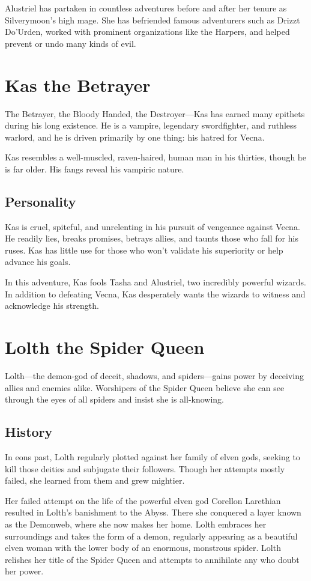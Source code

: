\documentclass[10pt,a4paper,twoside,bg=print,twocolumn,openany,nodeprecatedcode]{dndbook}
\begin{document}
Alustriel has partaken in countless adventures before and after her tenure as Silverymoon's high mage. She has befriended famous adventurers such as Drizzt Do'Urden, worked with prominent organizations like the Harpers, and helped prevent or undo many kinds of evil.

\section{Kas the Betrayer}
The Betrayer, the Bloody Handed, the Destroyer—Kas has earned many epithets during his long existence. He is a vampire, legendary swordfighter, and ruthless warlord, and he is driven primarily by one thing: his hatred for Vecna.

Kas resembles a well-muscled, raven-haired, human man in his thirties, though he is far older. His fangs reveal his vampiric nature.

\subsection{Personality}
Kas is cruel, spiteful, and unrelenting in his pursuit of vengeance against Vecna. He readily lies, breaks promises, betrays allies, and taunts those who fall for his ruses. Kas has little use for those who won't validate his superiority or help advance his goals.

In this adventure, Kas fools Tasha and Alustriel, two incredibly powerful wizards. In addition to defeating Vecna, Kas desperately wants the wizards to witness and acknowledge his strength.

\section{Lolth the Spider Queen}
Lolth—the demon-god of deceit, shadows, and spiders—gains power by deceiving allies and enemies alike. Worshipers of the Spider Queen believe she can see through the eyes of all spiders and insist she is all-knowing.

\subsection{History}
In eons past, Lolth regularly plotted against her family of elven gods, seeking to kill those deities and subjugate their followers. Though her attempts mostly failed, she learned from them and grew mightier.

Her failed attempt on the life of the powerful elven god Corellon Larethian resulted in Lolth's banishment to the Abyss. There she conquered a layer known as the Demonweb, where she now makes her home. Lolth embraces her surroundings and takes the form of a demon, regularly appearing as a beautiful elven woman with the lower body of an enormous, monstrous spider. Lolth relishes her title of the Spider Queen and attempts to annihilate any who doubt her power.
\end{document}

